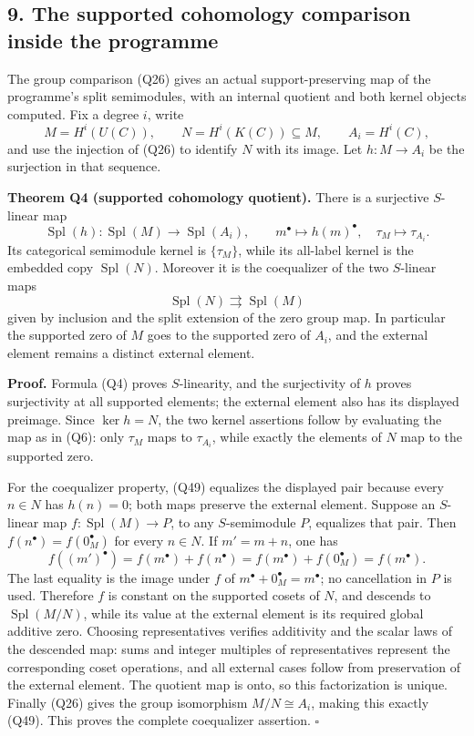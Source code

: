 \documentclass[
]{article}
\begin{document}
\subsection{9. The supported cohomology comparison inside the
programme}\label{the-supported-cohomology-comparison-inside-the-programme}

The group comparison (Q26) gives an actual support-preserving map of the
programme's split semimodules, with an internal quotient and both kernel
objects computed. Fix a degree \(i\), write \[
M=H^i(U(C)),\qquad N=H^i(K(C))\subseteq M,
\qquad A_i=H^i(C),
\tag{Q48}
\] and use the injection of (Q26) to identify \(N\) with its image. Let
\(h:M\to A_i\) be the surjection in that sequence.

\textbf{Theorem Q4 (supported cohomology quotient).} There is a
surjective \(S\)-linear map \[
\operatorname{Spl}(h):\operatorname{Spl}(M)
\longrightarrow\operatorname{Spl}(A_i),
\qquad m^\bullet\longmapsto h(m)^\bullet,
\quad\tau_M\longmapsto\tau_{A_i}.
\tag{Q49}
\] Its categorical semimodule kernel is \(\{\tau_M\}\), while its
all-label kernel is the embedded copy \(\operatorname{Spl}(N)\).
Moreover it is the coequalizer of the two \(S\)-linear maps \[
\operatorname{Spl}(N)\rightrightarrows\operatorname{Spl}(M)
\tag{Q50}
\] given by inclusion and the split extension of the zero group map. In
particular the supported zero of \(M\) goes to the supported zero of
\(A_i\), and the external element remains a distinct external element.

\textbf{Proof.} Formula (Q4) proves \(S\)-linearity, and the
surjectivity of \(h\) proves surjectivity at all supported elements; the
external element also has its displayed preimage. Since \(\ker h=N\),
the two kernel assertions follow by evaluating the map as in (Q6): only
\(\tau_M\) maps to \(\tau_{A_i}\), while exactly the elements of \(N\)
map to the supported zero.

For the coequalizer property, (Q49) equalizes the displayed pair because
every \(n\in N\) has \(h(n)=0\); both maps preserve the external
element. Suppose an \(S\)-linear map \(f:\operatorname{Spl}(M)\to P\),
to any \(S\)-semimodule \(P\), equalizes that pair. Then
\(f(n^\bullet)=f(0_M^\bullet)\) for every \(n\in N\). If \(m'=m+n\), one
has \[
f((m')^\bullet)
=f(m^\bullet)+f(n^\bullet)
=f(m^\bullet)+f(0_M^\bullet)
=f(m^\bullet).
\tag{Q51}
\] The last equality is the image under \(f\) of
\(m^\bullet+0_M^\bullet=m^\bullet\); no cancellation in \(P\) is used.
Therefore \(f\) is constant on the supported cosets of \(N\), and
descends to \(\operatorname{Spl}(M/N)\), while its value at the external
element is its required global additive zero. Choosing representatives
verifies additivity and the scalar laws of the descended map: sums and
integer multiples of representatives represent the corresponding coset
operations, and all external cases follow from preservation of the
external element. The quotient map is onto, so this factorization is
unique. Finally (Q26) gives the group isomorphism \(M/N\cong A_i\),
making this exactly (Q49). This proves the complete coequalizer
assertion. \(\square\)
\end{document}

